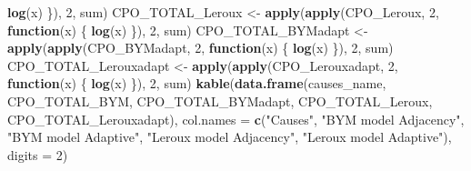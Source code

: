 \documentclass[]{article}
\newenvironment{Shaded}{\begin{snugshade}}{\end{snugshade}}
\newcommand{\KeywordTok}[1]{\textcolor[rgb]{0.13,0.29,0.53}{\textbf{#1}}}
\newcommand{\DataTypeTok}[1]{\textcolor[rgb]{0.13,0.29,0.53}{#1}}
\newcommand{\DecValTok}[1]{\textcolor[rgb]{0.00,0.00,0.81}{#1}}
\newcommand{\StringTok}[1]{\textcolor[rgb]{0.31,0.60,0.02}{#1}}
\newcommand{\ControlFlowTok}[1]{\textcolor[rgb]{0.13,0.29,0.53}{\textbf{#1}}}
\newcommand{\NormalTok}[1]{#1}
\begin{document}
\begin{Shaded}
\begin{Highlighting}[]
        \KeywordTok{log}\NormalTok{(x)}
\NormalTok{    \}), }\DecValTok{2}\NormalTok{, sum)}
\NormalTok{CPO_TOTAL_Leroux <-}\StringTok{ }\KeywordTok{apply}\NormalTok{(}\KeywordTok{apply}\NormalTok{(CPO_Leroux, }
    \DecValTok{2}\NormalTok{, }\ControlFlowTok{function}\NormalTok{(x) \{}
        \KeywordTok{log}\NormalTok{(x)}
\NormalTok{    \}), }\DecValTok{2}\NormalTok{, sum)}
\NormalTok{CPO_TOTAL_BYMadapt <-}\StringTok{ }\KeywordTok{apply}\NormalTok{(}\KeywordTok{apply}\NormalTok{(CPO_BYMadapt, }
    \DecValTok{2}\NormalTok{, }\ControlFlowTok{function}\NormalTok{(x) \{}
        \KeywordTok{log}\NormalTok{(x)}
\NormalTok{    \}), }\DecValTok{2}\NormalTok{, sum)}
\NormalTok{CPO_TOTAL_Lerouxadapt <-}\StringTok{ }\KeywordTok{apply}\NormalTok{(}\KeywordTok{apply}\NormalTok{(CPO_Lerouxadapt, }
    \DecValTok{2}\NormalTok{, }\ControlFlowTok{function}\NormalTok{(x) \{}
        \KeywordTok{log}\NormalTok{(x)}
\NormalTok{    \}), }\DecValTok{2}\NormalTok{, sum)}
\KeywordTok{kable}\NormalTok{(}\KeywordTok{data.frame}\NormalTok{(causes_name, CPO_TOTAL_BYM, }
\NormalTok{    CPO_TOTAL_BYMadapt, CPO_TOTAL_Leroux, }
\NormalTok{    CPO_TOTAL_Lerouxadapt), }\DataTypeTok{col.names =} \KeywordTok{c}\NormalTok{(}\StringTok{"Causes"}\NormalTok{, }
    \StringTok{"BYM model Adjacency"}\NormalTok{, }\StringTok{"BYM model Adaptive"}\NormalTok{, }
    \StringTok{"Leroux model Adjacency"}\NormalTok{, }\StringTok{"Leroux model Adaptive"}\NormalTok{), }
    \DataTypeTok{digits =} \DecValTok{2}\NormalTok{)}
\end{Highlighting}
\end{Shaded}
\end{document}
